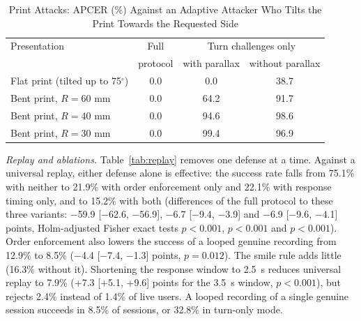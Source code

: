 \documentclass{ieeeaccess}
\begin{document}
\begin{table}[!t]
\centering
\caption{Print Attacks: APCER (\%) Against an Adaptive Attacker Who Tilts the Print Towards the Requested Side}
\label{tab:prints}
\footnotesize
\setlength{\tabcolsep}{3pt}
\begin{tabular}{@{}lccc@{}}
\toprule
Presentation & Full & \multicolumn{2}{c}{Turn challenges only} \\
 & protocol & with parallax & without parallax \\
\midrule
Flat print (tilted up to 75$^\circ$) & 0.0 & 0.0 & 38.7 \\
Bent print, $R{=}60$ mm & 0.0 & 64.2 & 91.7 \\
Bent print, $R{=}40$ mm & 0.0 & 94.6 & 98.6 \\
Bent print, $R{=}30$ mm & 0.0 & 99.4 & 96.9 \\

\bottomrule
\end{tabular}
\end{table}

\emph{Replay and ablations.} Table~\ref{tab:replay} removes one defense at a time. Against a universal replay, either defense alone is effective: the success rate falls from 75.1\% with neither to 21.9\% with order enforcement only and 22.1\% with response timing only, and to 15.2\% with both (differences of the full protocol to these three variants: $-$59.9 [$-$62.6, $-$56.9], $-$6.7 [$-$9.4, $-$3.9] and $-$6.9 [$-$9.6, $-$4.1] points, Holm-adjusted Fisher exact tests $p<0.001$, $p<0.001$ and $p<0.001$). Order enforcement also lowers the success of a looped genuine recording from 12.9\% to 8.5\% ($-$4.4 [$-$7.4, $-$1.3] points, $p=0.012$). The smile rule adds little (16.3\% without it). Shortening the response window to 2.5~s reduces universal replay to 7.9\% (+7.3 [+5.1, +9.6] points for the 3.5~s window, $p<0.001$), but rejects 2.4\% instead of 1.4\% of live users. A looped recording of a single genuine session succeeds in 8.5\% of sessions, or 32.8\% in turn-only mode.
\end{document}
